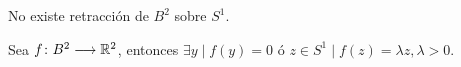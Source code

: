 \documentclass[GTSResumen.tex]{subfiles}
\begin{document}
\begin{teorema} No existe retracción de $B^2$ sobre $S^1$.
\end{teorema}
\begin{comment}
\begin{dem}
$\boxed{RA}$ Supongamos que $\exists\ r\func{B^2}{S^1}$ retracción $\Rightarrow r\circ i=Id_{S^1}$ con $i:S^1\longhookarrow B^2$ la inclusión. Entonces, como $B^2$ es contráctil

\[
\begin{tikzcd}
\Z\cong\pi_1(S^1,x_0)\arrow[r, "i_*"]\arrow[rr, "r_*\circ i_*(r\circ i)_*=Id_*=Id", bend right=-15] & \pi_1(B^2,x_0)=\{1\} \arrow[r, "r_*"] & \pi_1(S^1,x_0)\cong\Z \\
\end{tikzcd}
\]

Pero esto implica que $Id_\Z$ es el homomorfismo trivial, lo cual es una contradicción. $\QED$
\end{dem}
\end{comment}
\begin{prop} Sea $f\colon{B^2}\longrightarrow{\mathbb{R}^2}$, entonces $\exists y\mid f(y)=0$ ó $z\in S^1 \mid f(z)=\lambda z, \lambda>0$.
\end{prop}
\begin{comment}
\begin{dem}
Sea $g\func{B^2}{\R^2}$ definida como

\[
g(x)=\begin{cases}
(2||x||-1)x-(2-2||x||)f\left(\frac{x}{||x||}\right) & \text{si  } ||x||\geq\frac{1}{2}\\
-f(4||x|| x) & \text{si  } ||x||\leq\frac{1}{2}
\end{cases}
\]

Si $g(x)\neq 0\ \forall x$ se puede definir $h\func{B^2}{S^1}$ por $h(x)=\dfrac{g(x)}{||g(x)||}$. En ese caso, si $||x||=1$, $h(x)=x\Rightarrow h$ sería retracción de $B^2$ sobre $S^1$, lo cual es una contradicción con el teorema anterior. Por lo tanto, $\exists x_0\mid g(x_0)=0$.
\begin{itemize}
\item Si $||x_0||\leq\frac{1}{2}\Rightarrow -f(4||x_0||x_0)=0\Rightarrow f(y)=0$ en $y=4||x_0||x_0$.
\item Si $||x_0||\geq\frac{1}{2}\Rightarrow (2||x||-1)x_0-(2-2||x_0||)f\left(\dfrac{x_0}{||x_0||}\right)=0\Rightarrow f\left(\dfrac{x_0}{||x_0||}\right)=\dfrac{2||x_0||-1}{2-2||x_0||}x_0$. Si tomamos $z=\frac{x_0}{||x_0||}$, llegamos a que
\[
f(z)=\dfrac{||x_0||(2||x_0||-1)}{2-2||x_0||}z=\lambda z \mbox{    para } \lambda=\dfrac{||x_0||(2||x_0||-1)}{2-2||x_0||}>0.
\]
 $\QED$
\end{itemize}
\end{dem}
\end{comment}
\vspace{0.2cm}
\end{document}
